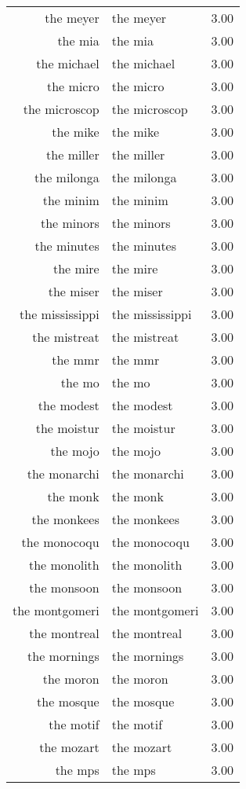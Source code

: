 \begin{table}[ht]
\begin{tabular}{rlr}
  the meyer & the meyer & 3.00 \\ 
  the mia & the mia & 3.00 \\ 
  the michael & the michael & 3.00 \\ 
  the micro & the micro & 3.00 \\ 
  the microscop & the microscop & 3.00 \\ 
  the mike & the mike & 3.00 \\ 
  the miller & the miller & 3.00 \\ 
  the milonga & the milonga & 3.00 \\ 
  the minim & the minim & 3.00 \\ 
  the minors & the minors & 3.00 \\ 
  the minutes & the minutes & 3.00 \\ 
  the mire & the mire & 3.00 \\ 
  the miser & the miser & 3.00 \\ 
  the mississippi & the mississippi & 3.00 \\ 
  the mistreat & the mistreat & 3.00 \\ 
  the mmr & the mmr & 3.00 \\ 
  the mo & the mo & 3.00 \\ 
  the modest & the modest & 3.00 \\ 
  the moistur & the moistur & 3.00 \\ 
  the mojo & the mojo & 3.00 \\ 
  the monarchi & the monarchi & 3.00 \\ 
  the monk & the monk & 3.00 \\ 
  the monkees & the monkees & 3.00 \\ 
  the monocoqu & the monocoqu & 3.00 \\ 
  the monolith & the monolith & 3.00 \\ 
  the monsoon & the monsoon & 3.00 \\ 
  the montgomeri & the montgomeri & 3.00 \\ 
  the montreal & the montreal & 3.00 \\ 
  the mornings & the mornings & 3.00 \\ 
  the moron & the moron & 3.00 \\ 
  the mosque & the mosque & 3.00 \\ 
  the motif & the motif & 3.00 \\ 
  the mozart & the mozart & 3.00 \\ 
  the mps & the mps & 3.00 \\ 

\end{tabular}
\end{table}
